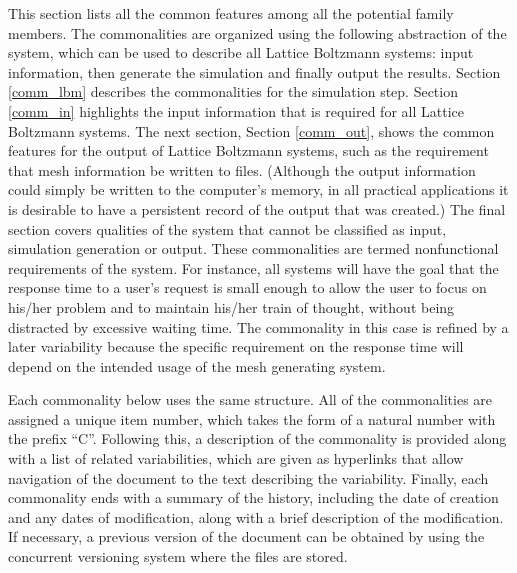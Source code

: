 \documentclass[12pt]{article}
\begin{document}
This section lists all the common features among all the potential family members. The commonalities are organized using the following abstraction of the system, which can be used to describe all Lattice Boltzmann systems: input information, then generate the simulation and finally output the results. Section \ref{comm_lbm} describes the commonalities for the simulation step. Section \ref{comm_in} highlights the input information that is required for all Lattice Boltzmann systems. The next section, Section \ref{comm_out}, shows the common features for the output of Lattice Boltzmann systems, such as the requirement that mesh information be written to files. (Although the output information could simply be written to the computer’s memory, in all practical applications it is desirable to have a persistent record of the output that was created.) The final section covers qualities of the system that cannot be classified as input, simulation generation or output. These commonalities are termed nonfunctional requirements of the system. For instance, all systems will have the goal that the response time to a user’s request is small enough to allow the user to focus on his/her problem and to maintain his/her train of thought, without being distracted by excessive waiting time. The commonality in this case is refined by a later variability because the specific requirement on the response time will depend on the intended usage of the mesh generating system. 

Each commonality below uses the same structure. All of the commonalities are assigned a unique item number, which takes the form of a natural number with the prefix ``C''. Following this, a description of the commonality is provided along with a list of related variabilities, which are given as hyperlinks that allow navigation of the document to the text describing the variability. Finally, each commonality ends with a summary of the history, including the date of creation and any dates of modification, along with a brief description of the modification. If necessary, a previous version of the document can be obtained by using the concurrent versioning system where the files are stored. 
\end{document}
